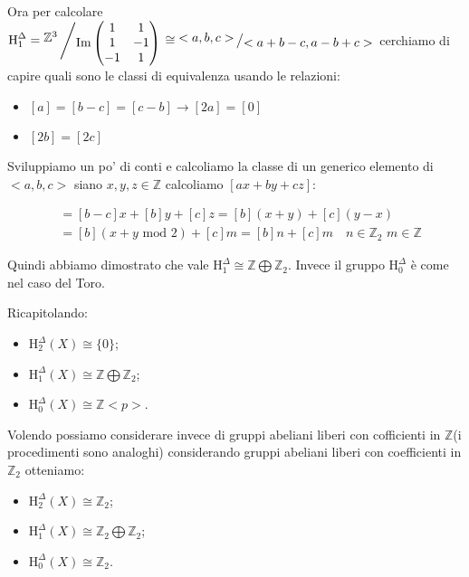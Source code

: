 \documentclass[11pt, a4paper, twoside]{article}
\newcommand{\bigslant}[2]{{\raisebox{.2em}{$#1$}\left/\raisebox{-.2em}{$#2$}\right.}}
\begin{document}
\begin{sol}
	Ora per calcolare  $\text{H}_1^{\Delta}=\bigslant{\mathbb{Z}^3}{\text{Im}\begin{pmatrix}1 &1\\1 &-1\\-1 &1\end{pmatrix}}\cong\bigslant{<a,b,c>}{<a+b-c,a-b+c>}$ cerchiamo di capire quali sono le classi di equivalenza usando le relazioni:
	\begin{itemize}
		\item $[a]=[b-c]=[c-b]\rightarrow [2a]=[0]$
		\item $[2b]=[2c]$
	\end{itemize}
	Sviluppiamo un po' di conti e calcoliamo la classe di un generico elemento di $<a,b,c>$ siano $x,y,z\in\mathbb{Z}$ calcoliamo $[ax+by+cz]$:
	\begin{center}
		\begin{align*}
			[ax+by+cz]&=[b-c]x+[b]y+[c]z=[b](x+y)+[c](y-x)\\&=[b](x+y \text{ mod } 2)+[c]m=[b]n+[c]m \quad n\in\mathbb{Z}_2\,\,m\in\mathbb{Z}
		\end{align*}
	\end{center}
	Quindi abbiamo dimostrato che vale $\text{H}_1^{\Delta}\cong\mathbb{Z}\bigoplus\mathbb{Z}_2$. Invece il gruppo $\text{H}_0^{\Delta}$ è come nel caso del Toro. 

	Ricapitolando:
	\begin{itemize}
		\item $\text{H}_{2}^{\Delta}(X)\cong\{0\}$;
		\item $\text{H}_{1}^{\Delta}(X)\cong\mathbb{Z}\bigoplus\mathbb{Z}_2$;
		\item $\text{H}_{0}^{\Delta}(X)\cong\mathbb{Z}<p>$.
	\end{itemize}
	Volendo possiamo considerare invece di gruppi abeliani liberi con cofficienti in $\mathbb{Z}$(i procedimenti sono analoghi) considerando gruppi abeliani liberi con coefficienti in $\mathbb{Z}_2$ otteniamo:
	\begin{itemize}
		\item $\text{H}_{2}^{\Delta}(X)\cong\mathbb{Z}_2$;
		\item $\text{H}_{1}^{\Delta}(X)\cong\mathbb{Z}_2\bigoplus\mathbb{Z}_2$;
		\item $\text{H}_{0}^{\Delta}(X)\cong\mathbb{Z}_2$.
	\end{itemize}
\end{sol}
\end{document}
